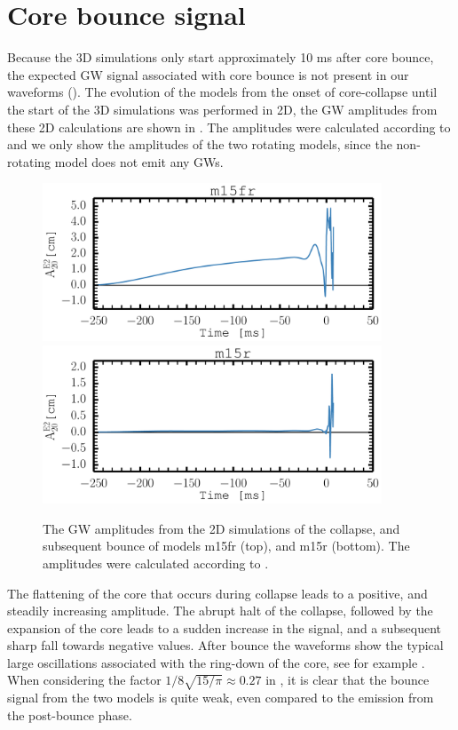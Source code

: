 \section{Core bounce signal}
Because the 3D simulations only start approximately 10 ms after core bounce, the
expected GW signal associated with core bounce is not present in our waveforms ().
The evolution of the models from the onset of core-collapse until the start of the 3D simulations
was performed in 2D, the GW amplitudes from these 2D calculations are shown in .
The amplitudes were calculated according to  and we only show the amplitudes of the two
rotating models, since the non-rotating model does not emit any GWs.
\begin{figure}[ht]         
\centering                            
\includegraphics[width=0.9\textwidth]{./images/paper2/bounce_fr.pdf} \\
\includegraphics[width=0.9\textwidth]{./images/paper2/bounce_r.pdf}
\caption{The GW amplitudes from the 2D simulations of the collapse, and subsequent bounce
of models m15fr (top), and m15r (bottom). The amplitudes were calculated according to .
\label{figp2:bounce}}
\end{figure}
The flattening of the core that occurs during collapse leads to a positive, and steadily increasing
amplitude. The abrupt halt of the collapse, followed by the expansion of the core leads to a sudden 
increase in the signal, and a subsequent sharp fall towards negative values. After bounce the waveforms show
the typical large oscillations associated with the ring-down of the core, see for example 
\cite{mueller_82,finn_90,moenchmeyer_91,yamada_95,zwerger_97}.
When considering the factor ${1}/{8}\sqrt{15/\pi} \approx 0.27$ in , it is clear that
the bounce signal from the two models is quite weak, even compared to the emission from the post-bounce phase.

